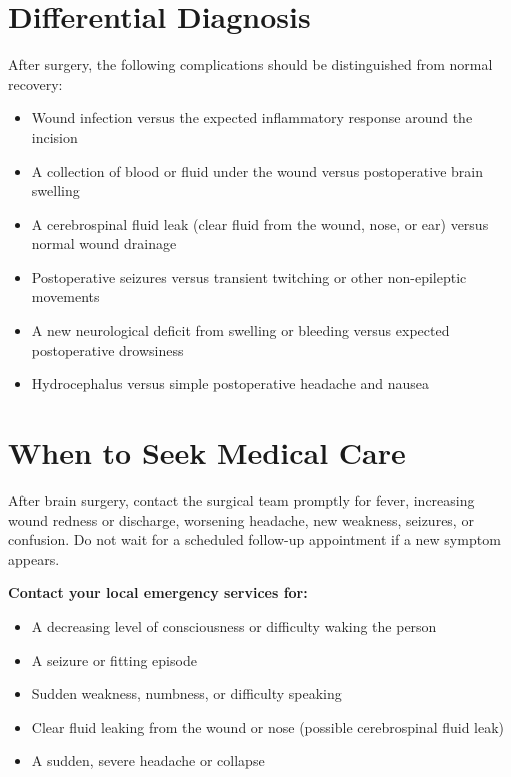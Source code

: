 \section*{Differential Diagnosis}
After surgery, the following complications should be distinguished from normal recovery:

\begin{itemize}
    \item Wound infection versus the expected inflammatory response around the incision
    \item A collection of blood or fluid under the wound versus postoperative brain swelling
    \item A cerebrospinal fluid leak (clear fluid from the wound, nose, or ear) versus normal wound drainage
    \item Postoperative seizures versus transient twitching or other non-epileptic movements
    \item A new neurological deficit from swelling or bleeding versus expected postoperative drowsiness
    \item Hydrocephalus versus simple postoperative headache and nausea
\end{itemize}

\section*{When to Seek Medical Care}
After brain surgery, contact the surgical team promptly for fever, increasing wound redness or discharge, worsening headache, new weakness, seizures, or confusion. Do not wait for a scheduled follow-up appointment if a new symptom appears.

\textbf{Contact your local emergency services for:}
\begin{itemize}
    \item A decreasing level of consciousness or difficulty waking the person
    \item A seizure or fitting episode
    \item Sudden weakness, numbness, or difficulty speaking
    \item Clear fluid leaking from the wound or nose (possible cerebrospinal fluid leak)
    \item A sudden, severe headache or collapse
\end{itemize}

